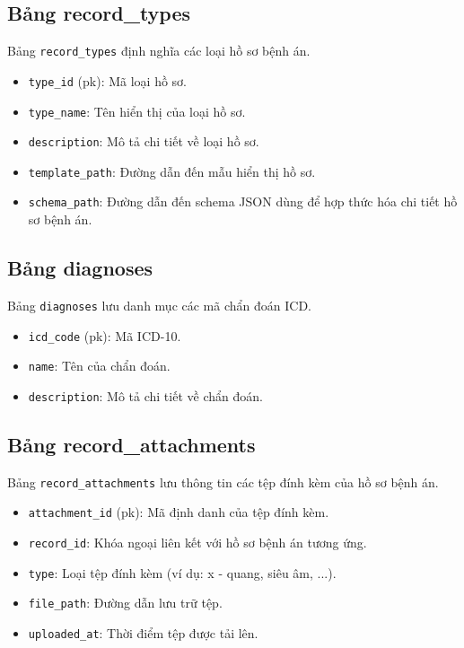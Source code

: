 \subsection{Bảng record\_types}
Bảng \texttt{record\_types} định nghĩa các loại hồ sơ bệnh án.
\begin{itemize}
  \item \texttt{type\_id} (pk): Mã loại hồ sơ.
  \item \texttt{type\_name}: Tên hiển thị của loại hồ sơ.
  \item \texttt{description}: Mô tả chi tiết về loại hồ sơ.
  \item \texttt{template\_path}: Đường dẫn đến mẫu hiển thị hồ sơ.
  \item \texttt{schema\_path}: Đường dẫn đến schema JSON dùng để hợp thức hóa chi tiết hồ sơ bệnh án.
\end{itemize}

\subsection{Bảng diagnoses}
Bảng \texttt{diagnoses} lưu danh mục các mã chẩn đoán ICD.
\begin{itemize}
  \item \texttt{icd\_code} (pk): Mã ICD-10.
  \item \texttt{name}: Tên của chẩn đoán.
  \item \texttt{description}: Mô tả chi tiết về chẩn đoán.
\end{itemize}

\subsection{Bảng record\_attachments}
Bảng \texttt{record\_attachments} lưu thông tin các tệp đính kèm của hồ sơ bệnh án.
\begin{itemize}
  \item \texttt{attachment\_id} (pk): Mã định danh của tệp đính kèm.
  \item \texttt{record\_id}: Khóa ngoại liên kết với hồ sơ bệnh án tương ứng.
  \item \texttt{type}: Loại tệp đính kèm (ví dụ: x - quang, siêu âm, ...).
  \item \texttt{file\_path}: Đường dẫn lưu trữ tệp.
  \item \texttt{uploaded\_at}: Thời điểm tệp được tải lên.
\end{itemize}

